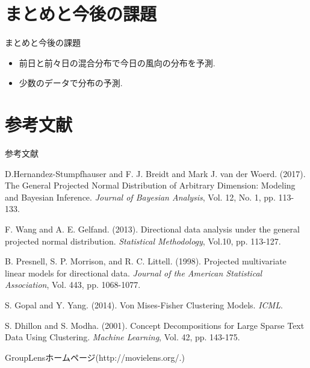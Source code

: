 \documentclass[dvipdfmx]{beamer} %
\begin{document}
\section{まとめと今後の課題}
\begin{frame}{まとめと今後の課題}

\begin{itemize}

\item
前日と前々日の混合分布で今日の風向の分布を予測.

\item
少数のデータで分布の予測.

\end{itemize}

\end{frame}

\section{参考文献}
\begin{frame}{参考文献}

{\scriptsize
\begin{thebibliography}{99}
\beamertemplatetextbibitems %

D.Hernandez-Stumpfhauser and F. J. Breidt and Mark J. van der Woerd. (2017). The General Projected Normal Distribution of Arbitrary Dimension: Modeling and Bayesian Inference. {\it Journal of Bayesian Analysis}, Vol. 12, No. 1, pp. 113-133.

F. Wang and A. E. Gelfand. (2013). Directional data analysis under the general
projected normal distribution. {\it Statistical Methodology}, Vol.10, pp. 113-127.

B. Presnell, S. P. Morrison, and R. C. Littell. (1998). Projected multivariate linear models for
directional data. {\it Journal of the American Statistical Association}, Vol. 443, pp. 1068-1077.


S. Gopal and Y. Yang. (2014). Von Mises-Fisher Clustering Models. {\it ICML}.

S. Dhillon and S. Modha. (2001). Concept Decompositions for Large Sparse Text Data Using
Clustering. {\it Machine Learning}, Vol. 42, pp. 143-175.

GroupLensホームページ(http://movielens.org/.) 

\end{thebibliography}
}

\end{frame}
\end{document}
